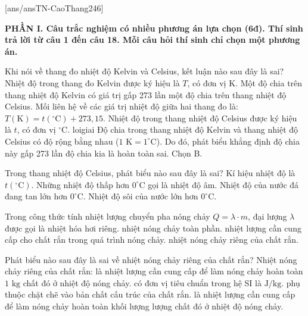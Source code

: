 [ans/ansTN-CaoThang246]

\noindent \textbf{PHẦN I. Câu trắc nghiệm có nhiều phương án lựa chọn (6đ). Thí sinh trả lời từ câu 1 đến câu 18. Mỗi câu hỏi thí sinh chỉ chọn một phương án.}
\vspace{0.2cm}

\begin{ex}%
	Khi nói về thang đo nhiệt độ Kelvin và Celsius, kết luận nào sau đây là sai?
	\choice
	{Nhiệt độ trong thang đo Kelvin được ký hiệu là $T$, có đơn vị K.}
	{\True Một độ chia trên thang nhiệt độ Kelvin có giá trị gấp 273 lần một độ chia trên thang nhiệt độ Celsius.}
	{Mối liên hệ về các giá trị nhiệt độ giữa hai thang đo là: $T(\text{K})=t(^\circ\text{C})+273,15$.}
	{Nhiệt độ trong thang nhiệt độ Celsius được ký hiệu là $t$, có đơn vị $^\circ\text{C}$.}
	loigiai{
		Độ chia trong thang nhiệt độ Kelvin và thang nhiệt độ Celsius có độ rộng bằng nhau ($1\text{ K} = 1^\circ\text{C}$). Do đó, phát biểu khẳng định độ chia này gấp 273 lần độ chia kia là hoàn toàn sai. Chọn B.
	}
\end{ex}

\begin{ex}%
	Trong thang nhiệt độ Celsius, phát biểu nào sau đây là sai?
	\choice
	{Kí hiệu nhiệt độ là $t(^\circ\text{C})$.}
	{Những nhiệt độ thấp hơn $0^\circ\text{C}$ gọi là nhiệt độ âm.}
	{\True Nhiệt độ của nước đá đang tan lớn hơn $0^\circ\text{C}$.}
	{Nhiệt độ sôi của nước lớn hơn $0^\circ\text{C}$.}
\end{ex}

\begin{ex}%
	Trong công thức tính nhiệt lượng chuyển pha nóng chảy $Q = \lambda \cdot m$, đại lượng $\lambda$ được gọi là
	\choice
	{nhiệt hóa hơi riêng.}
	{nhiệt nóng chảy toàn phần.}
	{nhiệt lượng cần cung cấp cho chất rắn trong quá trình nóng chảy.}
	{\True nhiệt nóng chảy riêng của chất rắn.}
\end{ex}

\begin{ex}%
	Phát biểu nào sau đây là sai về nhiệt nóng chảy riêng của chất rắn? Nhiệt nóng chảy riêng của chất rắn:
	\choice
	{là nhiệt lượng cần cung cấp để làm nóng chảy hoàn toàn $1\text{ kg}$ chất đó ở nhiệt độ nóng chảy.}
	{có đơn vị tiêu chuẩn trong hệ SI là $\text{J/kg}$.}
	{phụ thuộc chặt chẽ vào bản chất cấu trúc của chất rắn.}
	{\True là nhiệt lượng cần cung cấp để làm nóng chảy hoàn toàn khối lượng lượng chất đó ở nhiệt độ nóng chảy.}
\end{ex}

